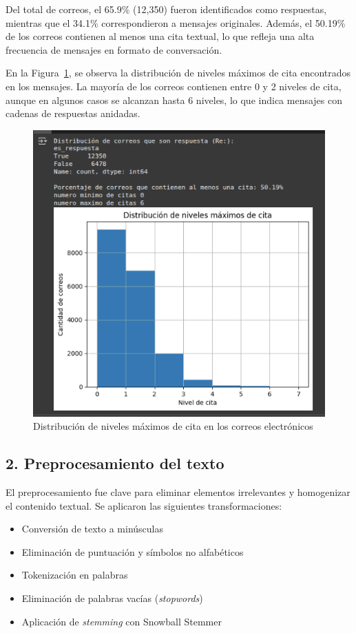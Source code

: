 \documentclass[journal]{IEEEtran} %
\begin{document}
\vspace{12pt}
Del total de correos, el 65.9\% (12,350) fueron identificados como respuestas, mientras que el 34.1\% correspondieron a mensajes originales. Además, el 50.19\% de los correos contienen al menos una cita textual, lo que refleja una alta frecuencia de mensajes en formato de conversación.

\vspace{12pt}
En la Figura~\ref{fig:niveles-cita}, se observa la distribución de niveles máximos de cita encontrados en los mensajes. La mayoría de los correos contienen entre 0 y 2 niveles de cita, aunque en algunos casos se alcanzan hasta 6 niveles, lo que indica mensajes con cadenas de respuestas anidadas.

\begin{figure}[H]
    \centering
    \includegraphics[width=0.7\linewidth]{fig1.png}
    \caption{Distribución de niveles máximos de cita en los correos electrónicos}
    \label{fig:niveles-cita}
\end{figure}

\subsection{2. Preprocesamiento del texto}
El preprocesamiento fue clave para eliminar elementos irrelevantes y homogenizar el contenido textual. Se aplicaron las siguientes transformaciones:
\begin{itemize}
    \item Conversión de texto a minúsculas
    \item Eliminación de puntuación y símbolos no alfabéticos
    \item Tokenización en palabras
    \item Eliminación de palabras vacías (\textit{stopwords})
    \item Aplicación de \textit{stemming} con Snowball Stemmer
\end{itemize}
\end{document}

